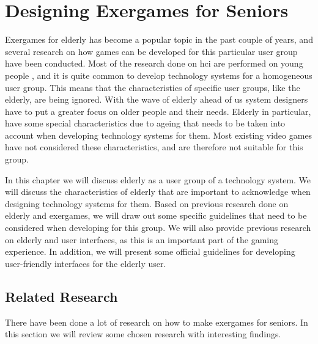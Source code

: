 \chapter{Designing Exergames for Seniors}
\label{chap:exforseniors}

Exergames for elderly has become a popular topic in the past couple of years, and several research on how games can be developed for this particular user group have been conducted. Most of the research done on \ac{hci} are performed on young people \cite{dickinson2007methods}, and it is quite common to develop technology systems for a homogeneous user group. This means that the characteristics of specific user groups, like the elderly, are being ignored. With the wave of elderly ahead of us system designers have to put a greater focus on older people and their needs. Elderly in particular, have some special characteristics due to ageing that needs to be taken into account when developing technology systems for them. Most existing video games have not considered these characteristics, and are therefore not suitable for this group. 

In this chapter we will discuss elderly as a user group of a technology system. We will discuss the characteristics of elderly that are important to acknowledge when designing technology systems for them. Based on previous research done on elderly and exergames, we will draw out some specific guidelines that need to be considered when developing for this group. We will also provide previous research on elderly and user interfaces, as this is an important part of the gaming experience.  In addition, we will present some official guidelines for developing user-friendly interfaces for the elderly user. 

\section{Related Research}
There have been done a lot of research on how to make exergames for seniors. In this section we will review some chosen research with interesting findings.

